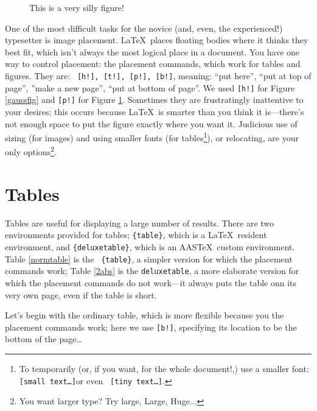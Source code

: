 \documentclass[12pt,preprint]{aastex}
\begin{document}
\begin{figure} [!p]
\begin{center}
\end{center}
\caption{This is a very silly figure! \label{silly}}
\end{figure}

	One of the most difficult tasks for the novice (and, even, the
experienced!) typesetter is image placement.  \LaTeX\ places floating
bodies where it thinks they best fit, which isn't always the most
logical place in a document. You have one way to control placement: the
placement commands, which work for tables and figures. They are: {\tt
[h!], [t!], [p!], [b!]}, meaning: ``put here'', ``put at top of page'',
''make a new page'', ``put at bottom of page''. We used {\tt [h!]} for
Figure \ref{gaussfig} and {\tt [p!]} for Figure \ref{silly}. Sometimes
they are frustratingly inattentive to your desires; this occurs because
\LaTeX\ is smarter than you think it is---there's not enough space to
put the figure exactly where you want it. Judicious use of sizing (for
images) and using smaller fonts (for tables\footnote{To temporarily (or,
  if you want, for the whole document!,) use
a smaller font: {\tt {\small [small text\dots]}}or even {\tt {\tiny
[tiny text\dots]}}.}), or relocating, are your only options\footnote{You
  want larger type? Try {\large large}, {\Large Large}, {\Huge Huge}...}.

\section{Tables}\label{tablesec}

Tables are useful for displaying a large number of results.  There are
two environments provided for tables; \verb&{table}&, which is a
\LaTeX\ resident environment, and \verb&{deluxetable}&, which is an
AAS\TeX\ custom environment.  Table \ref{normtable} is the {\tt
  \{table\}}, a simpler version for which the placement commands work;
Table \ref{2abs} is the {\tt deluxetable}, a more elaborate version for
which the placement commands do not work---it always puts the table onn
its very own page, even if the table is short.

\noindent Let's begin with the ordinary table, which is more flexible
because you the placement commands work; here we use {\tt [b!]},
specifying its location to be the bottom of the page\dots
\end{document}
